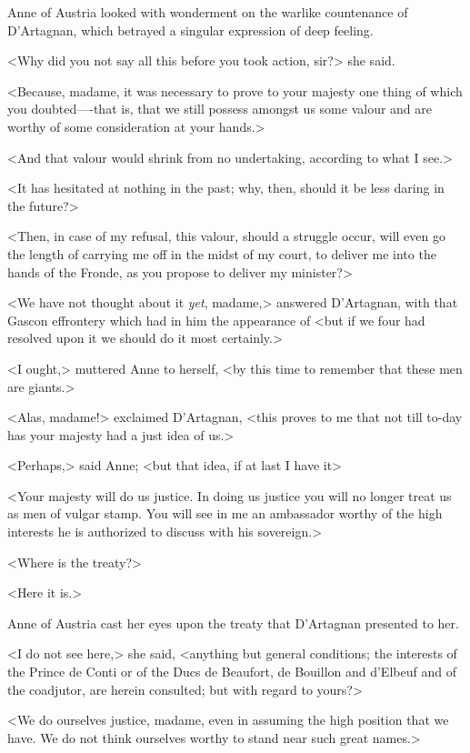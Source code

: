 Anne of Austria looked with wonderment on the warlike countenance of D'Artagnan, which betrayed a singular expression of deep feeling.

<Why did you not say all this before you took action, sir?> she said.

<Because, madame, it was necessary to prove to your majesty one thing of which you doubted—-that is, that we still possess amongst us some valour and are worthy of some consideration at your hands.>

<And that valour would shrink from no undertaking, according to what I see.>

<It has hesitated at nothing in the past; why, then, should it be less daring in the future?>

<Then, in case of my refusal, this valour, should a struggle occur, will even go the length of carrying me off in the midst of my court, to deliver me into the hands of the Fronde, as you propose to deliver my minister?>

<We have not thought about it \emph{yet}, madame,> answered D'Artagnan, with that Gascon effrontery which had in him the appearance of  <but if we four had resolved upon it we should do it most certainly.>

<I ought,> muttered Anne to herself, <by this time to remember that these men are giants.>

<Alas, madame!> exclaimed D'Artagnan, <this proves to me that not till to-day has your majesty had a just idea of us.>

<Perhaps,> said Anne; <but that idea, if at last I have it\longdash>

<Your majesty will do us justice. In doing us justice you will no longer treat us as men of vulgar stamp. You will see in me an ambassador worthy of the high interests he is authorized to discuss with his sovereign.>

<Where is the treaty?>

<Here it is.>

Anne of Austria cast her eyes upon the treaty that D'Artagnan presented to her.

<I do not see here,> she said, <anything but general conditions; the interests of the Prince de Conti or of the Ducs de Beaufort, de Bouillon and d'Elbeuf and of the coadjutor, are herein consulted; but with regard to yours?>

<We do ourselves justice, madame, even in assuming the high position that we have. We do not think ourselves worthy to stand near such great names.>

